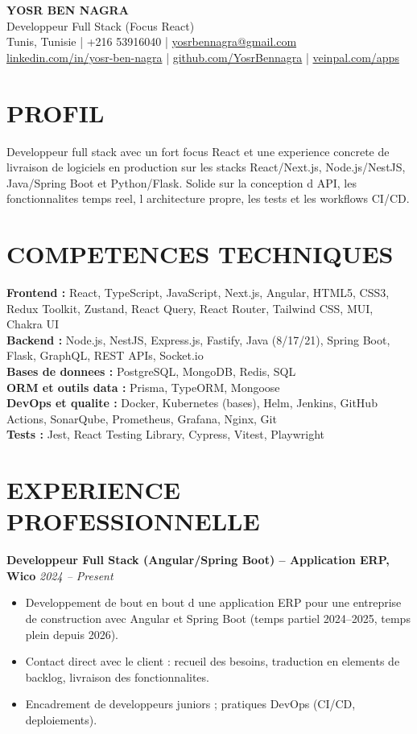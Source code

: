 \documentclass[10pt,a4paper]{article}
\begin{document}
\begin{center}
{\LARGE \textbf{YOSR BEN NAGRA}}\\
Developpeur Full Stack (Focus React)\\
Tunis, Tunisie \;|\; +216 53916040 \;|\; \href{mailto:yosrbennagra@gmail.com}{yosrbennagra@gmail.com}\\
\href{https://www.linkedin.com/in/yosr-ben-nagra/}{linkedin.com/in/yosr-ben-nagra} \;|\;
\href{https://github.com/YosrBennagra}{github.com/YosrBennagra} \;|\;
\href{https://veinpal.com/apps}{veinpal.com/apps}
\end{center}

\section*{PROFIL}
Developpeur full stack avec un fort focus React et une experience concrete de livraison de logiciels en production sur les stacks React/Next.js, Node.js/NestJS, Java/Spring Boot et Python/Flask. Solide sur la conception d API, les fonctionnalites temps reel, l architecture propre, les tests et les workflows CI/CD.

\section*{COMPETENCES TECHNIQUES}
\textbf{Frontend :} React, TypeScript, JavaScript, Next.js, Angular, HTML5, CSS3, Redux Toolkit, Zustand, React Query, React Router, Tailwind CSS, MUI, Chakra UI\\
\textbf{Backend :} Node.js, NestJS, Express.js, Fastify, Java (8/17/21), Spring Boot, Flask, GraphQL, REST APIs, Socket.io\\
\textbf{Bases de donnees :} PostgreSQL, MongoDB, Redis, SQL\\
\textbf{ORM et outils data :} Prisma, TypeORM, Mongoose\\
\textbf{DevOps et qualite :} Docker, Kubernetes (bases), Helm, Jenkins, GitHub Actions, SonarQube, Prometheus, Grafana, Nginx, Git\\
\textbf{Tests :} Jest, React Testing Library, Cypress, Vitest, Playwright

\section*{EXPERIENCE PROFESSIONNELLE}
\textbf{Developpeur Full Stack (Angular/Spring Boot) -- Application ERP, Wico} \hfill \textit{2024 -- Present}
\begin{itemize}
  \item Developpement de bout en bout d une application ERP pour une entreprise de construction avec Angular et Spring Boot (temps partiel 2024--2025, temps plein depuis 2026).
  \item Contact direct avec le client : recueil des besoins, traduction en elements de backlog, livraison des fonctionnalites.
  \item Encadrement de developpeurs juniors ; pratiques DevOps (CI/CD, deploiements).
\end{itemize}
\end{document}
